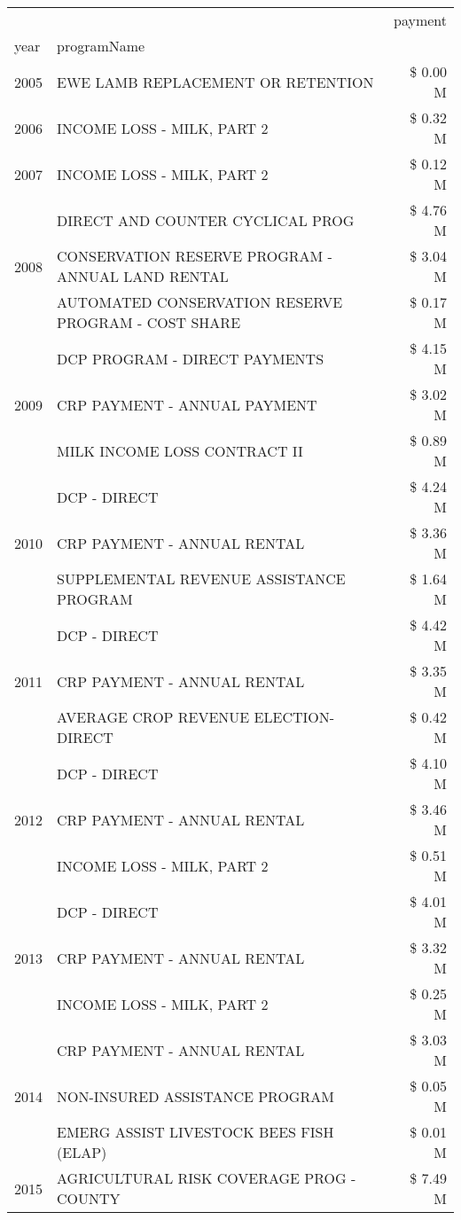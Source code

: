 \begin{tabular}{llr}
\toprule
 &  & payment \\
year & programName &  \\
\midrule
2005 & EWE LAMB REPLACEMENT OR RETENTION & \$ 0.00 M \\
\cline{1-3}
2006 & INCOME LOSS - MILK, PART 2 & \$ 0.32 M \\
\cline{1-3}
2007 & INCOME LOSS - MILK, PART 2 & \$ 0.12 M \\
\cline{1-3}
\multirow[t]{3}{*}{2008} & DIRECT AND COUNTER CYCLICAL PROG & \$ 4.76 M \\
 & CONSERVATION RESERVE PROGRAM - ANNUAL LAND RENTAL & \$ 3.04 M \\
 & AUTOMATED CONSERVATION RESERVE PROGRAM - COST SHARE & \$ 0.17 M \\
\cline{1-3}
\multirow[t]{3}{*}{2009} & DCP PROGRAM - DIRECT PAYMENTS & \$ 4.15 M \\
 & CRP PAYMENT - ANNUAL PAYMENT & \$ 3.02 M \\
 & MILK INCOME LOSS CONTRACT II & \$ 0.89 M \\
\cline{1-3}
\multirow[t]{3}{*}{2010} & DCP - DIRECT & \$ 4.24 M \\
 & CRP PAYMENT - ANNUAL RENTAL & \$ 3.36 M \\
 & SUPPLEMENTAL REVENUE ASSISTANCE PROGRAM & \$ 1.64 M \\
\cline{1-3}
\multirow[t]{3}{*}{2011} & DCP - DIRECT & \$ 4.42 M \\
 & CRP PAYMENT - ANNUAL RENTAL & \$ 3.35 M \\
 & AVERAGE CROP REVENUE ELECTION-DIRECT & \$ 0.42 M \\
\cline{1-3}
\multirow[t]{3}{*}{2012} & DCP - DIRECT & \$ 4.10 M \\
 & CRP PAYMENT - ANNUAL RENTAL & \$ 3.46 M \\
 & INCOME LOSS - MILK, PART 2 & \$ 0.51 M \\
\cline{1-3}
\multirow[t]{3}{*}{2013} & DCP - DIRECT & \$ 4.01 M \\
 & CRP PAYMENT - ANNUAL RENTAL & \$ 3.32 M \\
 & INCOME LOSS - MILK, PART 2 & \$ 0.25 M \\
\cline{1-3}
\multirow[t]{3}{*}{2014} & CRP PAYMENT - ANNUAL RENTAL & \$ 3.03 M \\
 & NON-INSURED ASSISTANCE PROGRAM & \$ 0.05 M \\
 & EMERG ASSIST LIVESTOCK BEES FISH (ELAP) & \$ 0.01 M \\
\cline{1-3}
\multirow[t]{3}{*}{2015} & AGRICULTURAL RISK COVERAGE PROG - COUNTY & \$ 7.49 M \\

\end{tabular}
